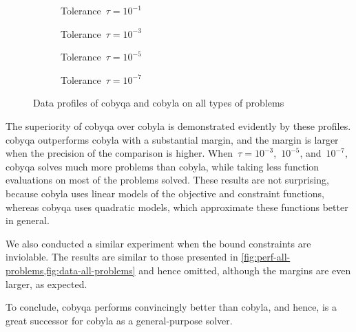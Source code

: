 \begin{figure}[ht]
    \centering
    \begin{subfigure}[b]{0.49\textwidth}
        \centering
        \caption{Tolerance~$\tau = 10^{-1}$}
    \end{subfigure}
    \hfill
    \begin{subfigure}[b]{0.49\textwidth}
        \centering
        \caption{Tolerance~$\tau = 10^{-3}$}
    \end{subfigure}
    \begin{subfigure}[b]{0.49\textwidth}
        \centering
        \caption{Tolerance~$\tau = 10^{-5}$}
    \end{subfigure}
    \hfill
    \begin{subfigure}[b]{0.49\textwidth}
        \centering
        \caption{Tolerance~$\tau = 10^{-7}$}
    \end{subfigure}
    \caption[Data profiles on all problems]{Data profiles of \gls{cobyqa} and \gls{cobyla} on all types of problems}
    \label{fig:data-all-problems}
\end{figure}

The superiority of \gls{cobyqa} over \gls{cobyla} is demonstrated evidently by these profiles.
\Gls{cobyqa} outperforms \gls{cobyla} with a substantial margin, and the margin is larger when the precision of the comparison is higher.
When~$\tau = 10^{-3}$,~$10^{-5}$, and~$10^{-7}$, \gls{cobyqa} solves much more problems than \gls{cobyla}, while taking less function evaluations on most of the problems solved.
These results are not surprising, because \gls{cobyla} uses linear models of the objective and constraint functions, whereas \gls{cobyqa} uses quadratic models, which approximate these functions better in general.

We also conducted a similar experiment when the bound constraints are inviolable.
The results are similar to those presented in \cref{fig:perf-all-problems,fig:data-all-problems} and hence omitted, although the margins are even larger, as expected.

To conclude, \gls{cobyqa} performs convincingly better than \gls{cobyla}, and hence, is a great successor for \gls{cobyla} as a general-purpose solver.

